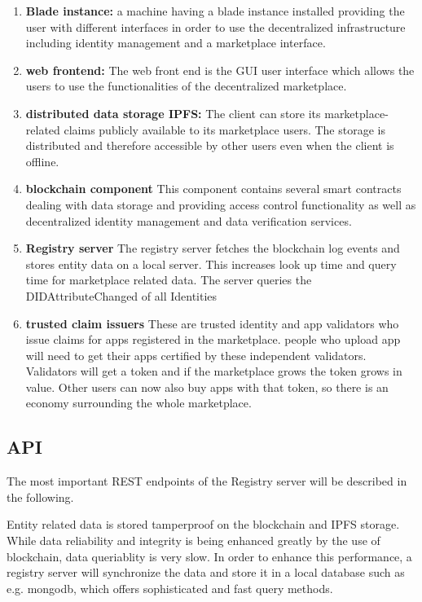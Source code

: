 \begin{enumerate}
    \item \textbf{Blade instance:}
    a machine having a blade instance installed providing the user with different interfaces in order to use the decentralized infrastructure including identity management and a marketplace interface. 
  
    \item \textbf{web frontend:} The web front end is the GUI user interface which allows the users to use the functionalities of the decentralized marketplace. 
  
    \item \textbf{distributed data storage IPFS:} The client can store its marketplace-related claims publicly available to its marketplace users. The storage is distributed and therefore accessible by other users even when the client is offline.  
  
    \item \textbf{blockchain component} This component contains several smart contracts dealing with data storage and providing access control functionality as well as decentralized identity management and data verification services. 
    
    \item \textbf{Registry server} The registry server fetches the blockchain log events and stores entity data on a local server. This increases look up time and query time for marketplace related data. 
    The server queries the DIDAttributeChanged of all Identities 
  
    \item \textbf{trusted claim issuers} These are trusted identity and app validators who issue claims for apps registered in the marketplace. people who upload app will need to get their apps certified by these independent validators. Validators will get a token and if the marketplace grows the token grows in value. Other users can now also buy apps with that token, so there is an economy surrounding the whole marketplace. 
  
\end{enumerate}

\subsection{API} 

The most important REST endpoints of the Registry server will be described in the following. 

Entity related data is stored tamperproof on the blockchain and IPFS storage. While data reliability and integrity is being enhanced greatly by the use of blockchain, data queriablity is very slow. In order to enhance this performance, a registry server will synchronize the data and store it in a local database such as e.g. mongodb, which offers sophisticated and fast query methods. 

